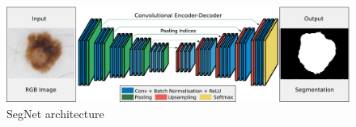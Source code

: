 \begin{figure}
    \centerline{\includegraphics[width=1\columnwidth]{02-related-works/figures/segnet-architecture.png}}
    \caption{ SegNet architecture \cite{badrinarayanan2017segnet} }
    \label{fig:segnet-architecture}
\end{figure}